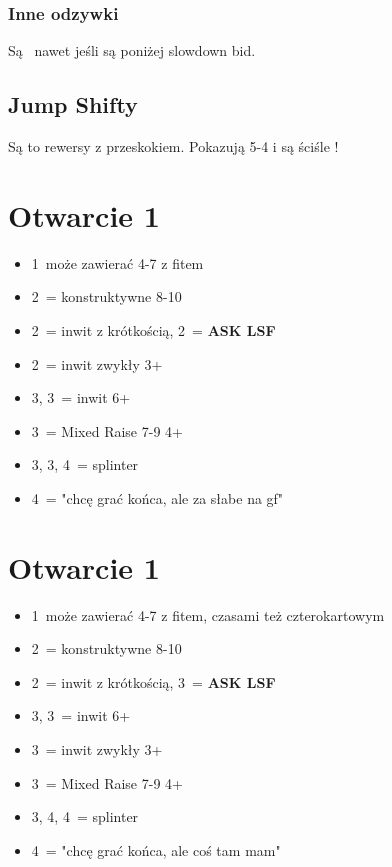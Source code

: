 \documentclass[12pt, a4paper]{article}
\newcommand{\lsf}{\color{WildStrawberry}\textbf{ASK LSF}\color{black}}
\begin{document}
\subsubsection*{Inne odzywki}
Są \gf\ nawet jeśli są poniżej slowdown bid.

\subsection*{Jump Shifty}
Są to rewersy z przeskokiem. Pokazują 5-4 i są ściśle \gf!



\pagebreak
\section{Otwarcie 1\hearts}
\begin{itemize}
    \item 1\nt\ może zawierać 4-7 z fitem
    \item 2\hearts\ = konstruktywne 8-10
    \item 2\spades\ = inwit z krótkością, 2\nt\ = \lsf
    \item 2\nt\ = inwit zwykły 3+\hearts
    \item 3\clubs, 3\diams\ = inwit 6+\minor
    \item 3\hearts\ = Mixed Raise 7-9 4+\hearts
    \item 3\spades, 3\nt, 4\clubs\ = splinter
    \item 4\diams\ = "chcę grać końca, ale za słabe na gf"
\end{itemize}

\section{Otwarcie 1\spades}
\begin{itemize}
    \item 1\nt\ może zawierać 4-7 z fitem, czasami też czterokartowym
    \item 2\spades\ = konstruktywne 8-10
    \item 2\nt\ = inwit z krótkością, 3\clubs\ = \lsf
    \item 3\clubs, 3\diams\ = inwit 6+\minor
    \item 3\hearts\ = inwit zwykły 3+\spades
    \item 3\spades\ = Mixed Raise 7-9 4+\spades
    \item 3\nt, 4\clubs, 4\diams\ = splinter
    \item 4\hearts\ = "chcę grać końca, ale coś tam mam"
\end{itemize}
\end{document}
